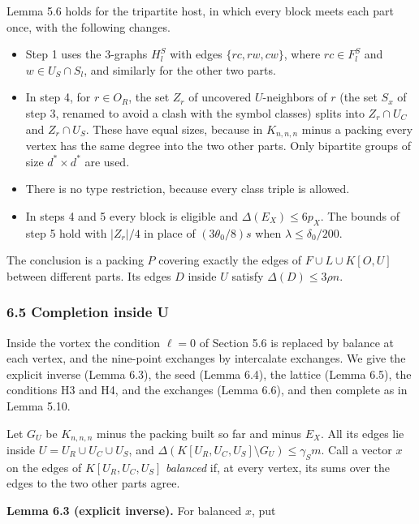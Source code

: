 \documentclass[english,11pt,a4paper]{article}
\providecommand{\tightlist}{\setlength{\itemsep}{0pt}\setlength{\parskip}{0pt}}
\begin{document}
Lemma 5.6 holds for the tripartite host, in which every block meets each part once, with the following changes.

\begin{itemize}
\tightlist
\item
  Step 1 uses the 3-graphs \(H^S_l\) with edges \(\{rc,rw,cw\}\), where \(rc\in F^S_l\) and \(w\in U_S\cap S_l\), and similarly for the other two parts.
\item
  In step 4, for \(r\in O_R\), the set \(Z_r\) of uncovered \(U\)-neighbors of \(r\) (the set \(S_x\) of step 3, renamed to avoid a clash with the symbol classes) splits into \(Z_r\cap U_C\) and \(Z_r\cap U_S\). These have equal sizes, because in \(K_{n,n,n}\) minus a packing every vertex has the same degree into the two other parts. Only bipartite groups of size \(d^*\times d^*\) are used.
\item
  There is no type restriction, because every class triple is allowed.
\item
  In steps 4 and 5 every block is eligible and \(\Delta(E_X)\le6p_X\). The bounds of step 5 hold with \(|Z_r|/4\) in place of \((3\theta_0/8)s\) when \(\lambda\le\delta_0/200\).
\end{itemize}

The conclusion is a packing \(P\) covering exactly the edges of \(F\cup L\cup K[O,U]\) between different parts. Its edges \(D\) inside \(U\) satisfy \(\Delta(D)\le3\rho n\).

\subsubsection{6.5 Completion inside U}\label{completion-inside-u-1}

Inside the vortex the condition \(\ell=0\) of Section 5.6 is replaced by balance at each vertex, and the nine-point exchanges by intercalate exchanges. We give the explicit inverse (Lemma 6.3), the seed (Lemma 6.4), the lattice (Lemma 6.5), the conditions H3 and H4, and the exchanges (Lemma 6.6), and then complete as in Lemma 5.10.

Let \(G_U\) be \(K_{n,n,n}\) minus the packing built so far and minus \(E_X\). All its edges lie inside \(U=U_R\cup U_C\cup U_S\), and \(\Delta(K[U_R,U_C,U_S]\setminus G_U)\le\gamma_Sm\). Call a vector \(x\) on the edges of \(K[U_R,U_C,U_S]\) \emph{balanced} if, at every vertex, its sums over the edges to the two other parts agree.

\textbf{Lemma 6.3 (explicit inverse).} For balanced \(x\), put
\end{document}
